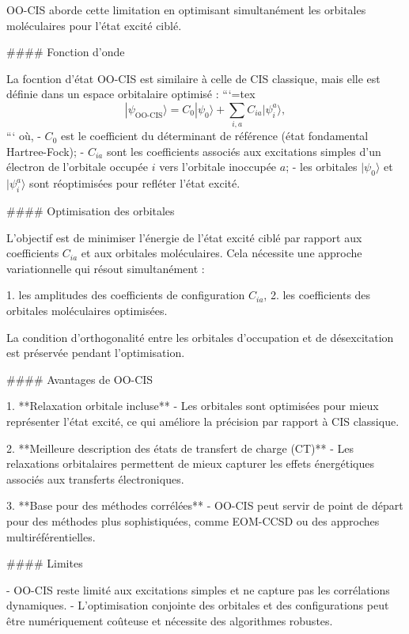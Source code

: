 \documentclass[12pt,a4paper]{report}
\begin{document}
\begin{markdown}
OO-CIS aborde cette limitation en optimisant simultanément les orbitales moléculaires pour l’état excité ciblé.

#### Fonction d'onde

La focntion d'état OO-CIS est similaire à celle de CIS classique, mais elle est définie dans un espace orbitalaire optimisé :
```{=tex}
\begin{equation}
|\psi_{\text{OO-CIS}}\rangle = C_0 |\psi_0\rangle + \sum_{i,a} C_{ia} |\psi_i^a\rangle ,
\end{equation}
```
où,
- $C_0$ est le coefficient du déterminant de référence (état fondamental Hartree-Fock);
- $C_{ia}$ sont les coefficients associés aux excitations simples d'un électron de l'orbitale occupée $i$ vers l'orbitale inoccupée $a$;
- les orbitales $|\psi_0\rangle$ et $|\psi_i^a\rangle$ sont réoptimisées pour refléter l'état excité.

#### Optimisation des orbitales

L’objectif est de minimiser l'énergie de l'état excité ciblé par rapport aux coefficients $C_{ia}$ et aux orbitales moléculaires. Cela nécessite une approche variationnelle qui résout simultanément :

1. les amplitudes des coefficients de configuration $C_{ia}$,
2. les coefficients des orbitales moléculaires optimisées.

La condition d’orthogonalité entre les orbitales d’occupation et de désexcitation est préservée pendant l’optimisation.

#### Avantages de OO-CIS

1. **Relaxation orbitale incluse**
   - Les orbitales sont optimisées pour mieux représenter l'état excité, ce qui améliore la précision par rapport à CIS classique.

2. **Meilleure description des états de transfert de charge (CT)**
   - Les relaxations orbitalaires permettent de mieux capturer les effets énergétiques associés aux transferts électroniques.

3. **Base pour des méthodes corrélées**
   - OO-CIS peut servir de point de départ pour des méthodes plus sophistiquées, comme EOM-CCSD ou des approches multiréférentielles.

#### Limites

- OO-CIS reste limité aux excitations simples et ne capture pas les corrélations dynamiques.
- L'optimisation conjointe des orbitales et des configurations peut être numériquement coûteuse et nécessite des algorithmes robustes.


\end{markdown}
\end{document}
